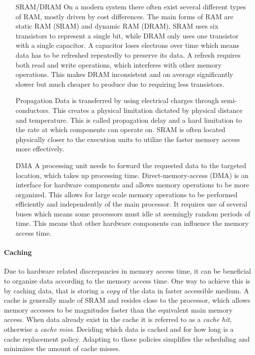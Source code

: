 \documentclass{article}
\begin{document}
\begin{itemize}
    \item [SRAM/DRAM]
    On a modern system there often exist several different types of RAM, mostly driven by cost differences.
    The main forms of RAM are static RAM (SRAM) and dynamic RAM (DRAM).
    SRAM uses six transistors to represent a single bit, while DRAM only uses one transistor with a single capacitor. 
    A capacitor loses electrons over time which means data has to be refreshed repeatedly to preserve its data.
    A refresh requires both read and write operations, which interferes with other memory operations.
    This makes DRAM inconsistent and on average significantly slower but much cheaper to produce due to requiring less transistors.\cite{memory}

    \item [Propagation]
    Data is transferred by using electrical charges through semi-conductors.
    This creates a physical limitation dictated by physical distance and temperature.
    This is called propagation delay and a hard limitation to the rate at which components can operate on.
    SRAM is often located physically closer to the execution units to utilize the faster memory access more effectively.
 
    \item [DMA]
    A processing unit needs to forward the requested data to the targeted location, which takes up processing time.
    Direct-memory-access (DMA) is an interface for hardware components and allows memory operations to be more organized.
    This allows for large scale memory operations to be performed efficiently and independently of the main processor.
    It requires use of several buses which means some processors must idle at seemingly random periods of time.
    This means that other hardware components can influence the memory access time.
 
\end{itemize}

\newpage

\paragraph{Caching}

Due to hardware related discrepancies in memory access time, it can be beneficial to organize data according to the memory access time.
One way to achieve this is by caching data, that is storing a {\it copy} of the data in faster accessible medium.
A cache is generally made of SRAM and resides close to the processor, which allows memory accesses to be magnitudes faster than the equivalent main memory access\cite{memory}.
When data already exist in the cache it is referred to as a {\it cache hit}, otherwise a {\it cache miss}.
Deciding which data is cached and for how long is a cache replacement policy.
Adapting to these policies simplifies the scheduling and minimizes the amount of cache misses.
\end{document}
